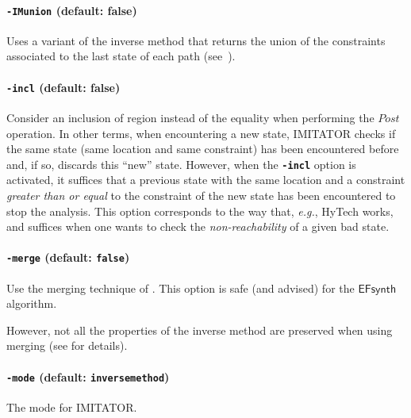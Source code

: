 \documentclass[a4paper,11pt]{report}
\newcommand{\EFsynth}{\ensuremath{\mathsf{EFsynth}}}
\newcommand{\hytech}{{\sc HyTech}}
\newcommand{\imitator}{\textsf{IMITATOR}}
\newcommand{\code}[1]{\textbf{\texttt{#1}}}
\newcommand{\styleOption}[1]{\textcolor{optioncolor}{\texttt{#1}}}
\newcommand{\eg}{\textcolor{colorok}{\textit{e.g.}, }}
\begin{document}
\paragraph{\styleOption{-IMunion} (default: false)}
Uses a variant of the inverse method that returns the union of the constraints associated to the last state of each path (see~\cite{AS13}).


\paragraph{\styleOption{-incl} (default: false)}
Consider an inclusion of region instead of the equality when performing the $\textit{Post}$ operation.
In other terms, when encountering a new state, \imitator{} checks if the same state (same location and same constraint) has been encountered before and, if so, discards this ``new'' state.
However, when the \code{-incl} option is activated, it suffices that a previous state with the same location and a constraint \emph{greater than or equal} to the constraint of the new state has been encountered to stop the analysis.
This option corresponds to the way that, \eg{} \hytech{} works, and suffices when one wants to check the \emph{non-reachability} of a given bad state.


\paragraph{\styleOption{-merge} (default: \code{false})}
Use the merging technique of \cite{AFS13atva}.
This option is safe (and advised) for the \EFsynth{} algorithm.

However, not all the properties of the inverse method are preserved when using merging (see \cite{AFS13atva} for details).



\paragraph{\styleOption{-mode} (default: \styleOption{inversemethod})}
The mode for \imitator{}.
\end{document}
